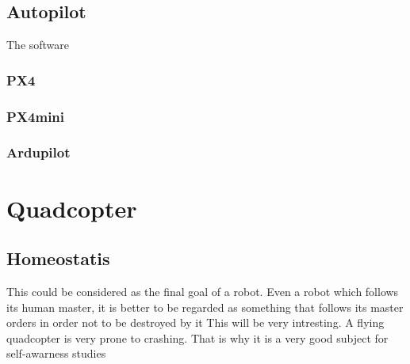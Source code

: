     
    \subsection{Autopilot}
    The software
    
    \subsubsection{PX4}
    
    \subsubsection{PX4mini}
    
    \subsubsection{Ardupilot}
    
\section{Quadcopter}
    \subsection{Homeostatis}
    This could be considered as the final goal of a robot. Even a robot which follows its human master, it is better to be regarded as something that follows its master orders in order not to be destroyed by it
    This will be very intresting. A flying quadcopter is very prone to crashing. That is why it is a very good subject for self-awarness studies
